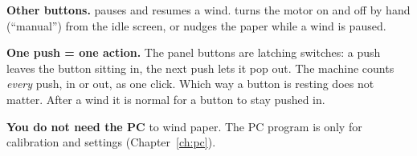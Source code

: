 {\small\textbf{Other buttons.}  pauses and resumes a wind.  turns
the motor on and off by hand (``manual'') from the idle screen, or nudges
the paper while a wind is paused.

\textbf{One push = one action.} The panel buttons are latching switches: a
push leaves the button sitting in, the next push lets it pop out. The
machine counts \emph{every} push, in or out, as one click. Which way a
button is resting does not matter. After a wind it is normal for a button
to stay pushed in.

\textbf{You do not need the PC} to wind paper. The PC program is only for
calibration and settings (Chapter~\ref{ch:pc}).\par}

